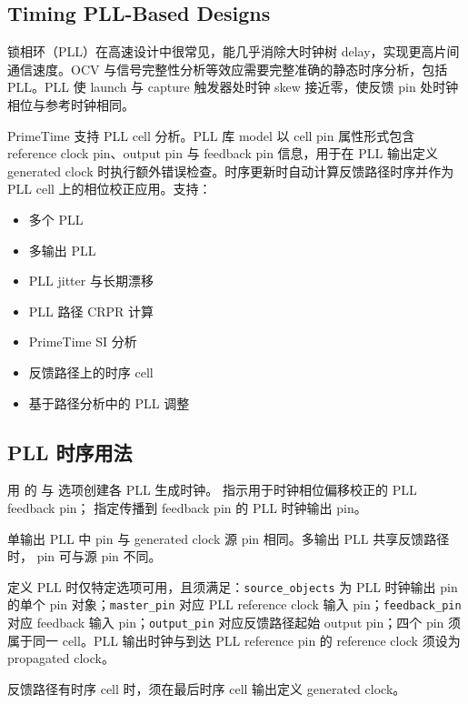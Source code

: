 \subsection*{Timing PLL-Based Designs}

锁相环（PLL）在高速设计中很常见，能几乎消除大时钟树 delay，实现更高片间通信速度。OCV 与信号完整性分析等效应需要完整准确的静态时序分析，包括 PLL。PLL 使 launch 与 capture 触发器处时钟 skew 接近零，使反馈 pin 处时钟相位与参考时钟相同。

PrimeTime 支持 PLL cell 分析。PLL 库 model 以 cell pin 属性形式包含 reference clock pin、output pin 与 feedback pin 信息，用于在 PLL 输出定义 generated clock 时执行额外错误检查。时序更新时自动计算反馈路径时序并作为 PLL cell 上的相位校正应用。支持：
\begin{itemize}
  \item 多个 PLL
  \item 多输出 PLL
  \item PLL jitter 与长期漂移
  \item PLL 路径 CRPR 计算
  \item PrimeTime SI 分析
  \item 反馈路径上的时序 cell
  \item 基于路径分析中的 PLL 调整
\end{itemize}

\subsection{PLL 时序用法}
用  的  与  选项创建各 PLL 生成时钟。 指示用于时钟相位偏移校正的 PLL feedback pin； 指定传播到 feedback pin 的 PLL 时钟输出 pin。

单输出 PLL 中  pin 与 generated clock 源 pin 相同。多输出 PLL 共享反馈路径时， pin 可与源 pin 不同。

定义 PLL 时仅特定选项可用，且须满足：\texttt{source\_objects} 为 PLL 时钟输出 pin 的单个 pin 对象；\texttt{master\_pin} 对应 PLL reference clock 输入 pin；\texttt{feedback\_pin} 对应 feedback 输入 pin；\texttt{output\_pin} 对应反馈路径起始 output pin；四个 pin 须属于同一 cell。PLL 输出时钟与到达 PLL reference pin 的 reference clock 须设为 propagated clock。


反馈路径有时序 cell 时，须在最后时序 cell 输出定义 generated clock。

